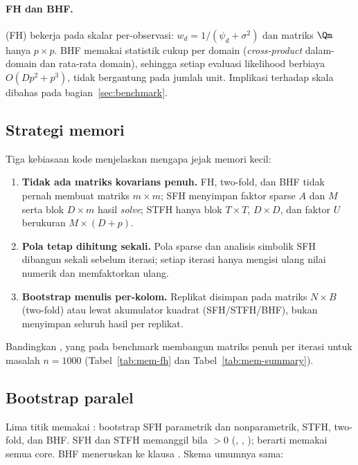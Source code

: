 \paragraph{FH dan BHF.}
 (FH) bekerja pada skalar per-observasi:
$w_d=1/(\psi_d+\sigma^2)$ dan matriks $\Qm$ hanya $p\times p$. BHF memakai
statistik cukup per domain (\emph{cross-product} dalam-domain dan rata-rata
domain), sehingga setiap evaluasi likelihood berbiaya $O(Dp^2+p^3)$, tidak
bergantung pada jumlah unit. Implikasi terhadap skala dibahas pada
bagian~\ref{sec:benchmark}.

\subsection{Strategi memori}\label{sec:memori}

Tiga kebiasaan kode menjelaskan mengapa jejak memori  kecil:

\begin{enumerate}[label=\arabic*.]
  \item \textbf{Tidak ada matriks kovarians penuh.} FH, two-fold, dan BHF
        tidak pernah membuat matriks $m\times m$; SFH menyimpan faktor sparse
        $A$ dan $M$ serta blok $D\times m$ hasil \emph{solve}; STFH hanya blok
        $T\times T$, $D\times D$, dan faktor $U$ berukuran $M\times(D+p)$.
  \item \textbf{Pola tetap dihitung sekali.} Pola sparse dan analisis simbolik
        SFH dibangun sekali sebelum iterasi; setiap iterasi hanya mengisi
        ulang nilai numerik dan memfaktorkan ulang.
  \item \textbf{Bootstrap menulis per-kolom.} Replikat disimpan pada matriks
        $N\times B$ (two-fold) atau lewat akumulator kuadrat (SFH/STFH/BHF),
        bukan menyimpan seluruh hasil per replikat.
\end{enumerate}

Bandingkan , yang pada benchmark membangun matriks penuh per
iterasi untuk masalah $n=1000$ (Tabel~\ref{tab:mem-fh} dan
Tabel~\ref{tab:mem-summary}).

\subsection{Bootstrap paralel}\label{sec:bootstrap-paralel}

Lima titik memakai : bootstrap SFH parametrik
dan nonparametrik, STFH, two-fold, dan BHF. SFH dan STFH memanggil
 bila  $>0$
(, ,
);  berarti memakai
semua core. BHF meneruskan  ke klausa .
Skema umumnya sama:

